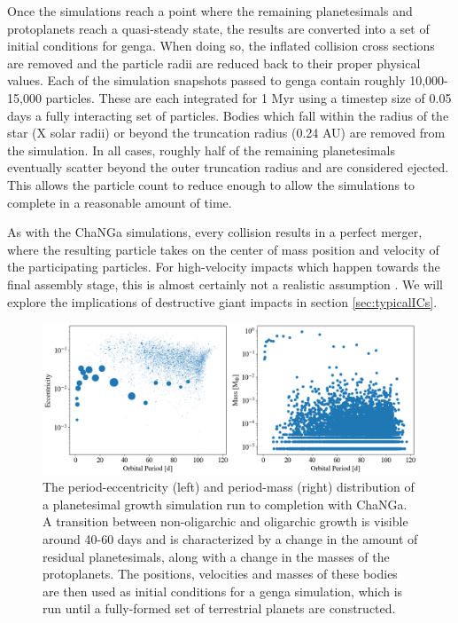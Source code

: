 Once the simulations reach a point where the remaining planetesimals and protoplanets reach a quasi-steady state, the results are converted into a set of initial conditions for {\sc genga}.  When doing so, the inflated collision cross sections are removed and the particle radii are reduced back to their proper physical values. Each of the simulation snapshots passed to {\sc genga} contain roughly 10,000-15,000 particles. These are each integrated for 1 Myr using a timestep size of 0.05 days a fully interacting set of particles. Bodies which fall within the radius of the star (X solar radii) or beyond the truncation radius (0.24 AU) are removed from the simulation. In all cases, roughly half of the remaining planetesimals eventually scatter beyond the outer truncation radius and are considered ejected. This allows the particle count to reduce enough to allow the simulations to complete in a reasonable amount of time.


As with the {\sc ChaNGa} simulations, every collision results in a perfect merger, where the resulting particle takes on the center of mass position and velocity of the participating particles. For high-velocity impacts which happen towards the final assembly stage, this is almost certainly not a realistic assumption \cite{marcus09}. We will explore the implications of destructive giant impacts in section \ref{sec:typicalICs}.

\begin{figure}
\begin{center}
    \includegraphics[width=\textwidth]{figures/stip/changa_ics.png}
    \caption{The period-eccentricity (left) and period-mass (right) distribution of a planetesimal growth simulation run to completion with {\sc ChaNGa}. A transition between non-oligarchic and oligarchic growth is visible around 40-60 days and is characterized by a change in the amount of residual planetesimals, along with a change in the masses of the protoplanets. The positions, velocities and masses of these bodies are then used as initial conditions for a {\sc genga} simulation, which is run until a fully-formed set of terrestrial planets are constructed.\label{fig:changa_ics}}
\end{center}
\end{figure}

